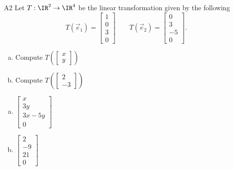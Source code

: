 \begin{problem}{A2}
Let $T: \IR^2 \rightarrow \IR^4$ be the linear transformation given by the following
$$T(\vec e_1)=\begin{bmatrix} 1 \\ 0 \\ 3 \\ 0\end{bmatrix}\hspace{2em}
T(\vec e_2)=\begin{bmatrix} 0 \\ 3 \\ -5 \\ 0 \end{bmatrix}.$$
\begin{enumerate}[(a)]
\item Compute \( T\left( \begin{bmatrix}x\\ y  \end{bmatrix} \right) \)
\item Compute \( T\left( \begin{bmatrix} 2 \\ -3\end{bmatrix} \right) \)
\end{enumerate}
\end{problem}
\begin{solution}
\begin{enumerate}[(a)]
\item \(\begin{bmatrix} x \\ 3y \\ 3x-5y \\ 0 \end{bmatrix}\)
\item \(\begin{bmatrix} 2 \\ -9 \\ 21 \\ 0\end{bmatrix}\)
\end{enumerate}
\end{solution}


